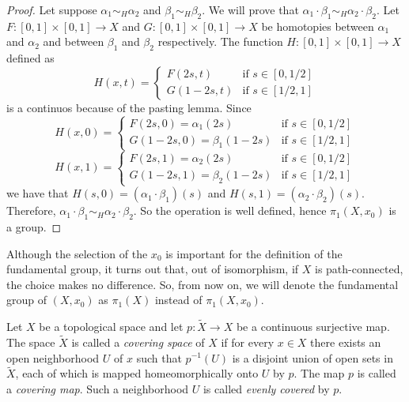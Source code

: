 \documentclass[12pt]{article}
\begin{document}
\begin{proof}
	Let suppose \(\alpha_1 \sim_H \alpha_2\) and \(\beta_1 \sim_H \beta_2\). We will prove that \(\alpha_1 \cdot \beta_1 \sim_H \alpha_2 \cdot \beta_2\). Let \(F: [0,1] \times [0,1] \rightarrow X\) and \(G: [0,1] \times [0,1] \rightarrow X\) be homotopies between \(\alpha_1\) and \(\alpha_2\) and between \(\beta_1\) and \(\beta_2\) respectively. The function \(H: [0,1] \times [0,1] \rightarrow X\) defined as
	\begin{equation*}
		H(x, t) = \begin{cases}
			F(2s, t) & \text{if } s \in [0, 1/2] \\
			G(1-2s, t) & \text{if } s \in [1/2, 1]
		\end{cases}
	\end{equation*}
	is a continuos because of the pasting lemma. Since
	\begin{equation*}
		H(x, 0) = \begin{cases}
			F(2s, 0) = \alpha_1(2s) & \text{if } s \in [0, 1/2] \\
			G(1-2s, 0) = \beta_1(1-2s) & \text{if } s \in [1/2, 1]
		\end{cases}
	\end{equation*}
	\begin{equation*}
		H(x, 1) = \begin{cases}
			F(2s, 1) = \alpha_2(2s) & \text{if } s \in [0, 1/2] \\
			G(1-2s, 1) = \beta_2(1-2s) & \text{if } s \in [1/2, 1]
		\end{cases}
	\end{equation*}
	we have that \(H(s,0) = (\alpha_1 \cdot \beta_1)(s)\) and \(H(s,1) = (\alpha_2 \cdot \beta_2)(s)\). Therefore, \(\alpha_1 \cdot \beta_1 \sim_H \alpha_2 \cdot \beta_2\). So the operation is well defined, hence \(\pi_1(X, x_0)\) is a group.
\end{proof}

Although the selection of the \(x_0\) is important for the definition of the fundamental group, it turns out that, out of isomorphism, if \(X\) is path-connected, the choice makes no difference. So, from now on, we will denote the fundamental group of \((X, x_0)\) as \(\pi_1(X)\) instead of \(\pi_1(X, x_0)\).

\begin{definition}
	Let \(X\) be a topological space and let \(p: \tilde{X} \rightarrow X\) be a continuous surjective map. The space \(\tilde{X}\) is called a \textit{covering space} of \(X\) if for every \(x \in X\) there exists an open neighborhood \(U\) of \(x\) such that \(p^{-1}(U)\) is a disjoint union of open sets in \(\tilde{X}\), each of which is mapped homeomorphically onto \(U\) by \(p\). The map \(p\) is called a \textit{covering map}. Such a neighborhood \(U\) is called \textit{evenly covered} by \(p\).
\end{definition}
\end{document}
